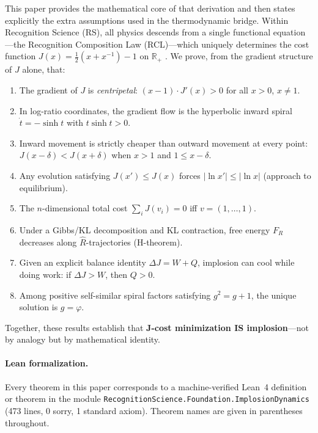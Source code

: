 \documentclass[11pt,a4paper]{article}
\theoremstyle{definition}
\newcommand{\phig}{\varphi}
\newcommand{\Jc}{J}
\newcommand{\Rhat}{\hat{R}}
\newcommand{\FR}{F_{\!R}}
\newcommand{\code}[1]{\texttt{\small #1}}
\begin{document}
This paper provides the mathematical core of that derivation and then states
explicitly the extra assumptions used in the thermodynamic bridge.  Within
Recognition Science (RS), all physics descends from a single functional
equation---the Recognition Composition Law (RCL)---which uniquely determines
the cost function $\Jc(x) = \tfrac{1}{2}(x + x^{-1}) - 1$ on
$\mathbb{R}_+$ \cite{Washburn2025Axioms}.  We prove, from the gradient
structure of $\Jc$ alone, that:

\begin{enumerate}[label=(\roman*),leftmargin=2em]
  \item The gradient of $\Jc$ is \emph{centripetal}: $(x-1)\cdot\Jc'(x) > 0$
        for all $x>0$, $x\ne 1$.
  \item In log-ratio coordinates, the gradient flow is the hyperbolic
        inward spiral $\dot t = -\sinh t$ with $t\sinh t > 0$.
  \item Inward movement is strictly cheaper than outward movement at every
        point: $\Jc(x-\delta) < \Jc(x+\delta)$ when $x>1$ and $1 \le x-\delta$.
  \item Any evolution satisfying $\Jc(x') \le \Jc(x)$ forces
        $|\ln x'| \le |\ln x|$ (approach to equilibrium).
  \item The $n$-dimensional total cost $\sum_i \Jc(v_i) = 0$ iff
        $v = (1,\ldots,1)$.
  \item Under a Gibbs/KL decomposition and KL contraction, free energy $\FR$
        decreases along $\Rhat$-trajectories (H-theorem).
  \item Given an explicit balance identity $\Delta\Jc = W + Q$, implosion can
        cool while doing work: if $\Delta\Jc > W$, then $Q>0$.
  \item Among positive self-similar spiral factors satisfying
        $g^2 = g+1$, the unique solution is $g = \phig$.
\end{enumerate}

Together, these results establish that \textbf{J-cost minimization IS
implosion}---not by analogy but by mathematical identity.

\paragraph{Lean formalization.}
Every theorem in this paper corresponds to a machine-verified Lean~4
definition or theorem in the module
\code{RecognitionScience.Foundation.ImplosionDynamics}
(473 lines, 0 sorry, 1 standard axiom).  Theorem names are given in
parentheses throughout.
\end{document}
